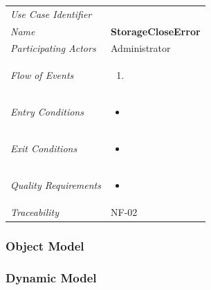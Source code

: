 \documentclass[12pt,letterpaper]{article}
\begin{document}
\begin{center}
	\begin{tabu} to 
		\toprule
		Use Case Identifier & \storagecloseerror{} \\
		Name & {\bf StorageCloseError} \\
		Participating Actors & Administrator \\
		Flow of Events & 
	    \begin{enumerate}[topsep=-1em,leftmargin=*]
		    \item 
		\end{enumerate} \\

		Entry Conditions &
		\begin{itemize}[topsep=-1em,leftmargin=*]
		    \item 
        \end{itemize} \\

		Exit Conditions &
		\begin{itemize}[topsep=-1em,leftmargin=*]
		    \item 
        \end{itemize} \\

		Quality Requirements &
		\begin{itemize}[topsep=-1em,leftmargin=*]
		    \item 
        \end{itemize} \\

		Traceability & NF-02 \\
		\toprule
	\end{tabu}
\end{center}

\subsubsection{Object Model}


\subsubsection{Dynamic Model}
\end{document}
